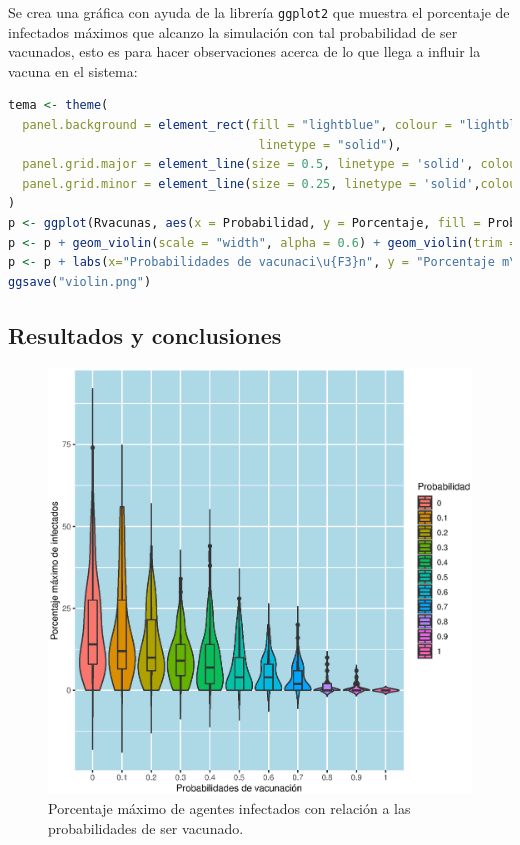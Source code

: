 \documentclass{article}
\begin{document}
Se crea una gr\'afica con ayuda de la librer\'ia \texttt{ggplot2} \cite{ggplot2} que muestra el porcentaje de infectados m\'aximos que alcanzo la simulaci\'on con tal probabilidad de ser vacunados, esto es para hacer observaciones acerca de lo que llega a influir la vacuna en el sistema:

\begin{lstlisting}[language=R]
tema <- theme(
  panel.background = element_rect(fill = "lightblue", colour = "lightblue", size = 0.5, 
                                   linetype = "solid"),
  panel.grid.major = element_line(size = 0.5, linetype = 'solid', colour = "white"), 
  panel.grid.minor = element_line(size = 0.25, linetype = 'solid',colour = "white")
)
p <- ggplot(Rvacunas, aes(x = Probabilidad, y = Porcentaje, fill = Probabilidad)) + geom_violin()
p <- p + geom_violin(scale = "width", alpha = 0.6) + geom_violin(trim = F) + geom_boxplot(width=0.3, alpha=0.8)
p <- p + labs(x="Probabilidades de vacunaci\u{F3}n", y = "Porcentaje m\u{E1}ximo de infectados") + tema
ggsave("violin.png")
\end{lstlisting}

\newpage

\subsection{Resultados y conclusiones}

\begin{figure}[h!]
\centering\includegraphics[width=120mm]{ResultadosP6.eps}
\caption{Porcentaje m\'aximo de agentes infectados con relaci\'on a las probabilidades de ser vacunado.}
\label{fig:resultados}
\end{figure}
\end{document}
